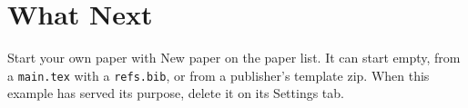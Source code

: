 \documentclass[11pt]{article}
\begin{document}
\section{What Next}\label{sec:next}

Start your own paper with New paper on the paper list. It can start empty, from
a \texttt{main.tex} with a \texttt{refs.bib}, or from a publisher's template
zip. When this example has served its purpose, delete it on its Settings tab.



\end{document}
